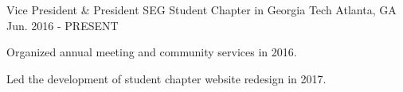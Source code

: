 

\begin{cventries}

  \cventry
    {Vice President \& President} %
    {SEG Student Chapter in Georgia Tech} %
    {Atlanta, GA} %
    {Jun. 2016 - PRESENT} %
    {
      \begin{cvitems} %
        \item {Organized annual meeting and community services in 2016.}
        \item {Led the development of student chapter website redesign in 2017.}
      \end{cvitems}
    }
\end{cventries}
